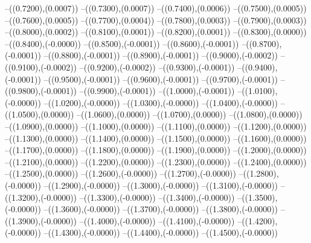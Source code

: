 {	--({\sx*(0.7200)},{\sy*(0.0007)})
	--({\sx*(0.7300)},{\sy*(0.0007)})
	--({\sx*(0.7400)},{\sy*(0.0006)})
	--({\sx*(0.7500)},{\sy*(0.0005)})
	--({\sx*(0.7600)},{\sy*(0.0005)})
	--({\sx*(0.7700)},{\sy*(0.0004)})
	--({\sx*(0.7800)},{\sy*(0.0003)})
	--({\sx*(0.7900)},{\sy*(0.0003)})
	--({\sx*(0.8000)},{\sy*(0.0002)})
	--({\sx*(0.8100)},{\sy*(0.0001)})
	--({\sx*(0.8200)},{\sy*(0.0001)})
	--({\sx*(0.8300)},{\sy*(0.0000)})
	--({\sx*(0.8400)},{\sy*(-0.0000)})
	--({\sx*(0.8500)},{\sy*(-0.0001)})
	--({\sx*(0.8600)},{\sy*(-0.0001)})
	--({\sx*(0.8700)},{\sy*(-0.0001)})
	--({\sx*(0.8800)},{\sy*(-0.0001)})
	--({\sx*(0.8900)},{\sy*(-0.0001)})
	--({\sx*(0.9000)},{\sy*(-0.0002)})
	--({\sx*(0.9100)},{\sy*(-0.0002)})
	--({\sx*(0.9200)},{\sy*(-0.0002)})
	--({\sx*(0.9300)},{\sy*(-0.0001)})
	--({\sx*(0.9400)},{\sy*(-0.0001)})
	--({\sx*(0.9500)},{\sy*(-0.0001)})
	--({\sx*(0.9600)},{\sy*(-0.0001)})
	--({\sx*(0.9700)},{\sy*(-0.0001)})
	--({\sx*(0.9800)},{\sy*(-0.0001)})
	--({\sx*(0.9900)},{\sy*(-0.0001)})
	--({\sx*(1.0000)},{\sy*(-0.0001)})
	--({\sx*(1.0100)},{\sy*(-0.0000)})
	--({\sx*(1.0200)},{\sy*(-0.0000)})
	--({\sx*(1.0300)},{\sy*(-0.0000)})
	--({\sx*(1.0400)},{\sy*(-0.0000)})
	--({\sx*(1.0500)},{\sy*(0.0000)})
	--({\sx*(1.0600)},{\sy*(0.0000)})
	--({\sx*(1.0700)},{\sy*(0.0000)})
	--({\sx*(1.0800)},{\sy*(0.0000)})
	--({\sx*(1.0900)},{\sy*(0.0000)})
	--({\sx*(1.1000)},{\sy*(0.0000)})
	--({\sx*(1.1100)},{\sy*(0.0000)})
	--({\sx*(1.1200)},{\sy*(0.0000)})
	--({\sx*(1.1300)},{\sy*(0.0000)})
	--({\sx*(1.1400)},{\sy*(0.0000)})
	--({\sx*(1.1500)},{\sy*(0.0000)})
	--({\sx*(1.1600)},{\sy*(0.0000)})
	--({\sx*(1.1700)},{\sy*(0.0000)})
	--({\sx*(1.1800)},{\sy*(0.0000)})
	--({\sx*(1.1900)},{\sy*(0.0000)})
	--({\sx*(1.2000)},{\sy*(0.0000)})
	--({\sx*(1.2100)},{\sy*(0.0000)})
	--({\sx*(1.2200)},{\sy*(0.0000)})
	--({\sx*(1.2300)},{\sy*(0.0000)})
	--({\sx*(1.2400)},{\sy*(0.0000)})
	--({\sx*(1.2500)},{\sy*(0.0000)})
	--({\sx*(1.2600)},{\sy*(-0.0000)})
	--({\sx*(1.2700)},{\sy*(-0.0000)})
	--({\sx*(1.2800)},{\sy*(-0.0000)})
	--({\sx*(1.2900)},{\sy*(-0.0000)})
	--({\sx*(1.3000)},{\sy*(-0.0000)})
	--({\sx*(1.3100)},{\sy*(-0.0000)})
	--({\sx*(1.3200)},{\sy*(-0.0000)})
	--({\sx*(1.3300)},{\sy*(-0.0000)})
	--({\sx*(1.3400)},{\sy*(-0.0000)})
	--({\sx*(1.3500)},{\sy*(-0.0000)})
	--({\sx*(1.3600)},{\sy*(-0.0000)})
	--({\sx*(1.3700)},{\sy*(-0.0000)})
	--({\sx*(1.3800)},{\sy*(-0.0000)})
	--({\sx*(1.3900)},{\sy*(-0.0000)})
	--({\sx*(1.4000)},{\sy*(-0.0000)})
	--({\sx*(1.4100)},{\sy*(-0.0000)})
	--({\sx*(1.4200)},{\sy*(-0.0000)})
	--({\sx*(1.4300)},{\sy*(-0.0000)})
	--({\sx*(1.4400)},{\sy*(-0.0000)})
	--({\sx*(1.4500)},{\sy*(-0.0000)})
}
